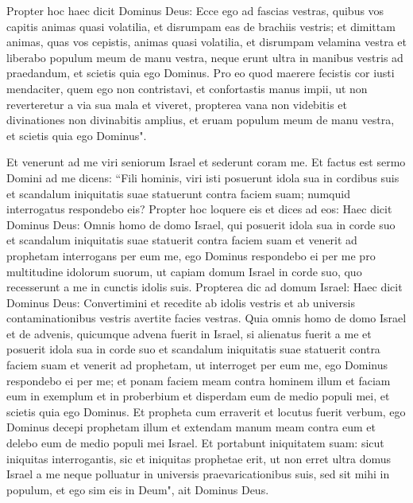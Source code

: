\begin{biblechapter}
\verse Propter hoc haec dicit Dominus Deus: Ecce ego ad fascias vestras, quibus vos capitis animas quasi volatilia, et disrumpam eas de brachiis vestris; et dimittam animas, quas vos cepistis, animas quasi volatilia, 
\verse et disrumpam velamina vestra et liberabo populum meum de manu vestra, neque erunt ultra in manibus vestris ad praedandum, et scietis quia ego Dominus. 
\verse Pro eo quod maerere fecistis cor iusti mendaciter, quem ego non contristavi, et confortastis manus impii, ut non reverteretur a via sua mala et viveret,  
\verse propterea vana non videbitis et divinationes non divinabitis amplius, et eruam populum meum de manu vestra, et scietis quia ego Dominus". 
\end{biblechapter}

\begin{biblechapter}  
\verse Et venerunt ad me viri seniorum Israel et sederunt coram me. 
\verse Et factus est sermo Domini ad me dicens: 
\verse “Fili hominis, viri isti posuerunt idola sua in cordibus suis et scandalum iniquitatis suae statuerunt contra faciem suam; numquid interrogatus respondebo eis? 
\verse Propter hoc loquere eis et dices ad eos: Haec dicit Dominus Deus: Omnis homo de domo Israel, qui posuerit idola sua in corde suo et scandalum iniquitatis suae statuerit contra faciem suam et venerit ad prophetam interrogans per eum me, ego Dominus respondebo ei per me pro multitudine idolorum suorum, 
\verse ut capiam domum Israel in corde suo, quo recesserunt a me in cunctis idolis suis. 
\verse Propterea dic ad domum Israel: Haec dicit Dominus Deus: Convertimini et recedite ab idolis vestris et ab universis contaminationibus vestris avertite facies vestras. 
\verse Quia omnis homo de domo Israel et de advenis, quicumque advena fuerit in Israel, si alienatus fuerit a me et posuerit idola sua in corde suo et scandalum iniquitatis suae statuerit contra faciem suam et venerit ad prophetam, ut interroget per eum me, ego Dominus respondebo ei per me; 
\verse et ponam faciem meam contra hominem illum et faciam eum in exemplum et in proberbium et disperdam eum de medio populi mei, et scietis quia ego Dominus.  
\verse Et propheta cum erraverit et locutus fuerit verbum, ego Dominus decepi prophetam illum et extendam manum meam contra eum et delebo eum de medio populi mei Israel. 
\verse Et portabunt iniquitatem suam: sicut iniquitas interrogantis, sic et iniquitas prophetae erit, 
\verse ut non erret ultra domus Israel a me neque polluatur in universis praevaricationibus suis, sed sit mihi in populum, et ego sim eis in Deum", ait Dominus Deus. 

\end{biblechapter}
